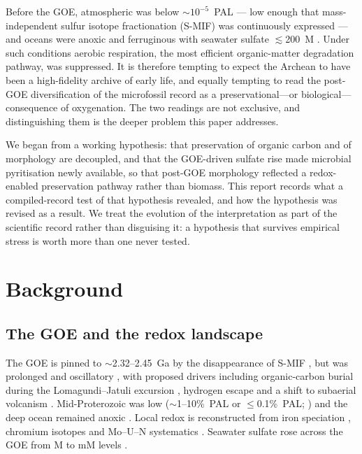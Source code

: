 \documentclass[11pt]{article}
\begin{document}
Before the GOE, atmospheric  was below $\sim$$10^{-5}$~PAL --- low enough that
mass-independent sulfur isotope fractionation (S-MIF) was continuously expressed
\citep{Pavlov2002,Farquhar2000} --- and oceans were anoxic and ferruginous with seawater sulfate
$\lesssim$200~\textmu M \citep{Habicht2002,Crowe2014}. Under such conditions aerobic respiration,
the most efficient organic-matter degradation pathway, was suppressed. It is therefore tempting to
expect the Archean to have been a high-fidelity archive of early life, and equally tempting to read
the post-GOE diversification of the microfossil record \citep{Javaux2018,Wacey2014} as a
preservational---or biological---consequence of oxygenation. The two readings are not exclusive, and
distinguishing them is the deeper problem this paper addresses.

We began from a working hypothesis: that preservation of organic carbon and of morphology are
decoupled, and that the GOE-driven sulfate rise made microbial pyritisation newly available, so
that post-GOE morphology reflected a redox-enabled preservation pathway rather than biomass. This
report records what a compiled-record test of that hypothesis revealed, and how the hypothesis was
revised as a result. We treat the evolution of the interpretation as part of the scientific record
rather than disguising it: a hypothesis that survives empirical stress is worth more than one never
tested.

\section{Background}

\subsection{The GOE and the redox landscape}
The GOE is pinned to $\sim$2.32--2.45~Ga by the disappearance of S-MIF
\citep{Bekker2004,Farquhar2003}, but was prolonged and oscillatory
\citep{Lyons2014,Garduno2024}, with proposed drivers including organic-carbon burial during the
Lomagundi--Jatuli excursion \citep{Bekker2012,Hodgskiss2023}, hydrogen escape \citep{Catling2001}
and a shift to subaerial volcanism \citep{Kump2007}. Mid-Proterozoic  was low
($\sim$1--10\%~PAL or $\le$0.1\%~PAL; \citealp{Lyons2014,Planavsky2014}) and the deep ocean
remained anoxic \citep{Canfield1998}. Local redox is reconstructed from iron speciation
\citep[$\mathrm{Fe_{HR}}/\mathrm{Fe_T}>0.38$;][]{Poulton2005,Poulton2011}, chromium isotopes
\citep{Frei2009} and Mo--U--N systematics \citep{Scott2008,Garvin2009}. Seawater sulfate rose across
the GOE from \textmu M to mM levels \citep{Habicht2002,Kah2004,Crowe2014}.
\end{document}
